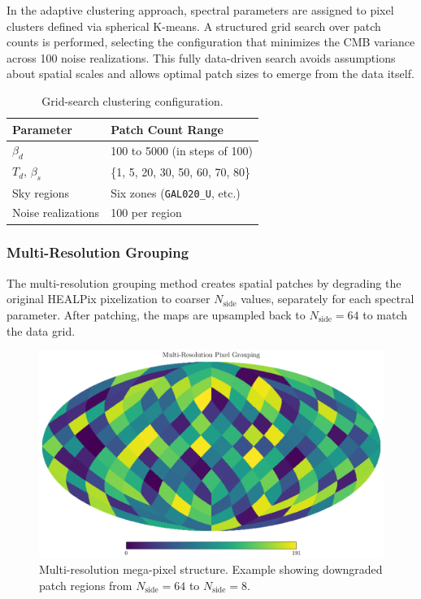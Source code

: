 \documentclass[%
 reprint,
bibnotes,
 amsmath,amssymb,
 aps,
floatfix, 
]{revtex4-2}
\begin{document}
In the adaptive clustering approach, spectral parameters are assigned to pixel clusters defined via spherical K-means. A structured grid search over patch counts is performed, selecting the configuration that minimizes the CMB variance across 100 noise realizations. This fully data-driven search avoids assumptions about spatial scales and allows optimal patch sizes to emerge from the data itself.

\begin{table}[h]
    \centering
    \small
    \caption{Grid-search clustering configuration.}
    \begin{tabular}{@{}p{3.8cm}|p{4.5cm}@{}}
        \toprule
        \textbf{Parameter} & \textbf{Patch Count Range} \\
        \midrule
        \( \beta_d \) & 100 to 5000 (in steps of 100) \\
        \( T_d \), \( \beta_s \) & \{1, 5, 20, 30, 50, 60, 70, 80\} \\
        Sky regions & Six zones (\texttt{GAL020\_U}, etc.) \\
        Noise realizations & 100 per region \\
        \bottomrule
    \end{tabular}
\end{table}

\subsubsection*{Multi-Resolution Grouping}

The multi-resolution grouping method creates spatial patches by degrading the original HEALPix pixelization to coarser \( N_{\text{side}} \) values, separately for each spectral parameter. After patching, the maps are upsampled back to \( N_{\text{side}} = 64 \) to match the data grid.

\begin{figure}[H]
    \centering
    \includegraphics[width=0.9\linewidth]{figures/multi_resolution_pixel_grouping.pdf}
    \caption{Multi-resolution mega-pixel structure. Example showing downgraded patch regions from \( N_{\text{side}} = 64 \) to \( N_{\text{side}} = 8 \).}
    \label{fig:multires_megapixels}
\end{figure}
\end{document}
